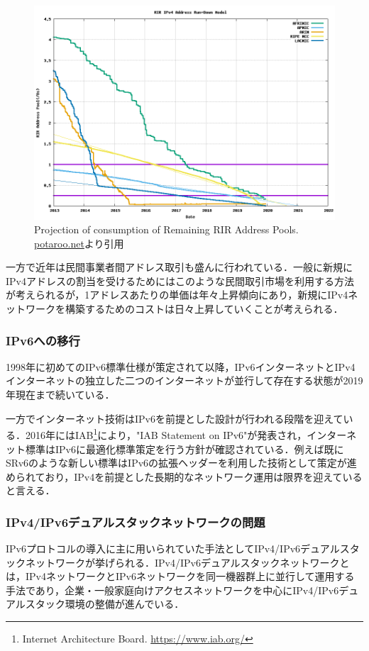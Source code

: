 \begin{figure}
	\centering
	\includegraphics[width=12cm]{img/plotend.png}
	\caption{Projection of consumption of Remaining RIR Address Pools. \url{potaroo.net}より引用\cite{potaroo_IPv4}}
	\label{fig:potaroo_IPv4}
\end{figure}
    
一方で近年は民間事業者間アドレス取引も盛んに行われている．一般に新規にIPv4アドレスの割当を受けるためにはこのような民間取引市場を利用する方法が考えられるが，1アドレスあたりの単価は年々上昇傾向にあり\cite{howard2013internet}，新規にIPv4ネットワークを構築するためのコストは日々上昇していくことが考えられる．


\subsubsection{IPv6への移行}
\label{introduction:background:ipv6_transition}
1998年に初めてのIPv6標準仕様が策定されて以降\cite{RFC2460}，IPv6インターネットとIPv4インターネットの独立した二つのインターネットが並行して存在する状態が2019年現在まで続いている．

一方でインターネット技術はIPv6を前提とした設計が行われる段階を迎えている．2016年にはIAB\footnote{Internet Architecture Board. \url{https://www.iab.org/}}により，"IAB Statement on IPv6"が発表され，インターネット標準はIPv6に最適化標準策定を行う方針が確認されている\cite{IAB_statement}．例えば既にSRv6のような新しい標準はIPv6の拡張ヘッダーを利用した技術として策定が進められており，IPv4を前提とした長期的なネットワーク運用は限界を迎えていると言える．

\subsubsection{IPv4/IPv6デュアルスタックネットワークの問題}
\label{introduction:background:dualstack_problems}
IPv6プロトコルの導入に主に用いられていた手法としてIPv4/IPv6デュアルスタックネットワークが挙げられる\cite{durand2001deploying}．IPv4/IPv6デュアルスタックネットワークとは，IPv4ネットワークとIPv6ネットワークを同一機器群上に並行して運用する手法であり，企業・一般家庭向けアクセスネットワークを中心にIPv4/IPv6デュアルスタック環境の整備が進んでいる．

